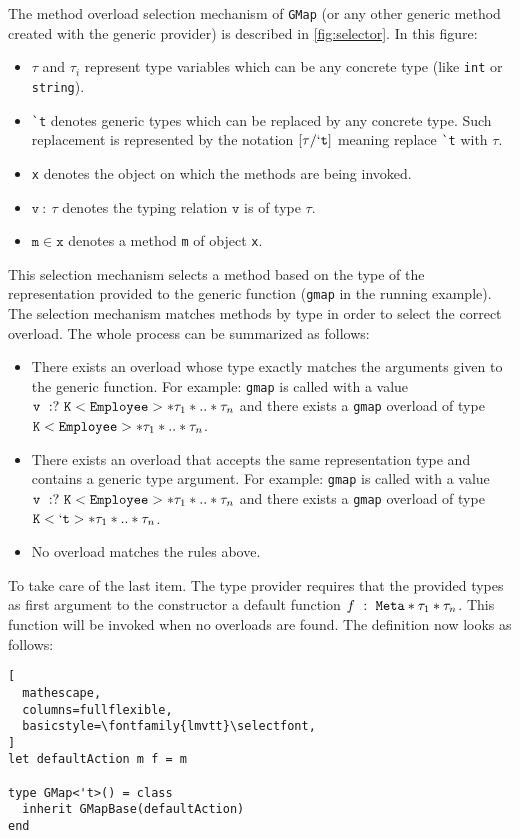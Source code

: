 \documentclass{sigplanconf}
\begin{document}
The method overload selection mechanism of \verb+GMap+ (or any other
generic method created with the generic provider) is described in
\ref{fig:selector}. In this figure:
\begin{itemize}
\item $\tau$ and $\tau_i$ represent type variables which can be any
  concrete type (like \verb+int+ or \verb+string+).
\item \verb+`t+ denotes generic types which can be replaced by any
  concrete type. Such replacement is represented by the notation
  $[\tau/\mathtt{`t}]$ meaning replace \verb=`t= with $\tau$.
\item \verb+x+ denotes the object on which the methods are being invoked.
\item $\mathtt{v}\ :\ \tau$ denotes the typing relation $\mathtt{v}$ is of type $\tau$.
\item $\mathtt{m}\in\mathtt{x}$ denotes a method \verb+m+ of object \verb+x+.
\end{itemize}
This selection mechanism selects a method based on the type of the
representation provided to the generic function (\verb+gmap+ in the
running example). The selection mechanism matches methods by type in
order to select the correct overload. The whole process can be
summarized as follows:
\begin{itemize}
\item There exists an overload whose type exactly matches the
  arguments given to the generic function. For example: \verb+gmap+ is
  called with a value $\mathtt{v}\ :?\
  \mathtt{K}<\mathtt{Employee}>*\tau_1*..*\tau_n$ and there exists a
  \verb+gmap+ overload of type
  $\mathtt{K}<\mathtt{Employee}>*\tau_1*..*\tau_n$.
\item There exists an overload that accepts the same representation
  type and contains a generic type argument. For example: \verb+gmap+
  is called with a value $\mathtt{v}\ :?\
  \mathtt{K}<\mathtt{Employee}>*\tau_1*..*\tau_n$ and there exists a
  \verb+gmap+ overload of type $\mathtt{K}<\mathtt{`t}>*\tau_1*..*\tau_n$.
\item No overload matches the rules above.
\end{itemize}
To take care of the last item. The type provider requires that the
provided types as first argument to the constructor a default function
$f\ :\ \mathtt{Meta}*\tau_1*\tau_n$. This function will be invoked when no
overloads are found. The definition now looks as follows:
\begin{lstlisting}[
  mathescape,
  columns=fullflexible,
  basicstyle=\fontfamily{lmvtt}\selectfont,
]
let defaultAction m f = m

type GMap<'t>() = class
  inherit GMapBase(defaultAction)
end
\end{lstlisting}
\end{document}
